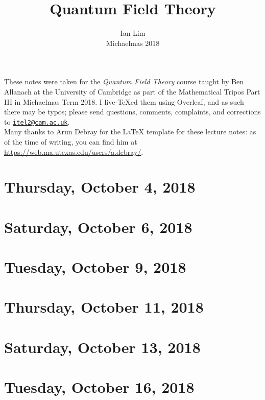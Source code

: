\documentclass[reqno]{amsart}
\begin{document}
\title{Quantum Field Theory}
\author{Ian Lim\\ Michaelmas 2018}
\maketitle
{\small\noindent These notes were taken for the \textit{Quantum Field Theory} course taught by Ben Allanach at the University of Cambridge as part of the Mathematical Tripos Part III in Michaelmas Term 2018. I live-\TeX ed them using Overleaf, and as such there may be typos; please send questions, comments, complaints, and corrections to 
\href{mailto:itel2@cam.ac.uk?subject=QFT\%20Lecture\%20Notes}{\texttt{itel2@cam.ac.uk}}.\\
Many thanks to Arun Debray for the {\LaTeX} template for these lecture notes: as of the time of writing, you can find him at \url{https://web.ma.utexas.edu/users/a.debray/}.}

\tableofcontents

\section{Thursday, October 4, 2018}
	
	
\section{Saturday, October 6, 2018}
	
	
\section{Tuesday, October 9, 2018}
	
	
\section{Thursday, October 11, 2018}
	
	
\section{Saturday, October 13, 2018}
	
	
\section{Tuesday, October 16, 2018}
	
\end{document}
